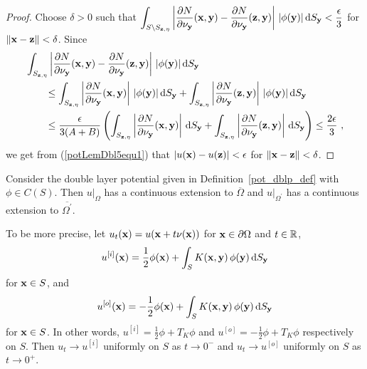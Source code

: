 \begin{proof}
Choose $\delta > 0$ such that
$\displaystyle
\int_{S \setminus S_{\mathbf{z},\eta}} \left| \frac{\partial{N}}{\partial \mathbf{\nu}_{\mathbf{y}}}
(\mathbf{x},\mathbf{y}) - \frac{\partial{N}}{\partial \mathbf{\nu}_{\mathbf{y}}} (\mathbf{z},\mathbf{y})
\right|\,|\phi(\mathbf{y})| \,\mathrm{d}{S}_{\mathbf{y}} < \frac{\epsilon}{3}$ for
$\|\mathbf{x} - \mathbf{z}\| < \delta$.
Since
\begin{align*}
&\int_{S_{\mathbf{z},\eta}}
\left| \frac{\partial{N}}{\partial \mathbf{\nu}_{\mathbf{y}}} (\mathbf{x},\mathbf{y})
- \frac{\partial{N}}{\partial \mathbf{\nu}_{\mathbf{y}}} (\mathbf{z},\mathbf{y}) \right|\,
|\phi(\mathbf{y})| \,\mathrm{d}{S}_{\mathbf{y}} \\
& \qquad \leq \int_{S_{\mathbf{z},\eta}}
\left| \frac{\partial{N}}{\partial \mathbf{\nu}_{\mathbf{y}}} (\mathbf{x},\mathbf{y}) \right|\,
|\phi(\mathbf{y})| \,\mathrm{d}{S}_{\mathbf{y}} 
+ \int_{S_{\mathbf{z},\eta}}
\left| \frac{\partial{N}}{\partial \mathbf{\nu}_{\mathbf{y}}} (\mathbf{z},\mathbf{y}) \right|\,
|\phi(\mathbf{y})| \,\mathrm{d}{S}_{\mathbf{y}} \\
&\qquad \leq \frac{\epsilon}{3(A+B)} \left(
\int_{S_{\mathbf{z},\eta}}
\left| \frac{\partial{N}}{\partial \mathbf{\nu}_{\mathbf{y}}} (\mathbf{x},\mathbf{y}) \right| \,\mathrm{d}{S}_{\mathbf{y}} 
+ \int_{S_{\mathbf{z},\eta}}
\left| \frac{\partial{N}}{\partial \mathbf{\nu}_{\mathbf{y}}} (\mathbf{z},\mathbf{y}) \right| \,\mathrm{d}{S}_{\mathbf{y}}
\right)
\leq \frac{2\epsilon}{3} \ ,
\end{align*}
we get from (\ref{potLemDbl5equ1}) that
$|u(\mathbf{x}) - u(\mathbf{z})| < \epsilon$ for 
$\|\mathbf{x} - \mathbf{z}\| < \delta$.
\end{proof}

\begin{theorem} \label{pot_double_layer}
Consider the double layer potential given in
Definition~\ref{pot_dblp_def} with $\phi \in C(S)$.
Then $\displaystyle u\big|_\Omega$ has a continuous extension to
$\overline{\Omega}$ and $\displaystyle u\big|_{\Omega^{\prime}}$
has a continuous extension to $\displaystyle \overline{\Omega^{\prime}}$.

To be more precise, let
$\displaystyle u_t(\mathbf{x}) = u(\mathbf{x} + t \mathbf{\nu}(\mathbf{x}))$
for $\mathbf{x} \in \partial \Omega$ and $t \in \mathbb{R}$,
\begin{equation} \label{pot_dblpT1}
u^{[i]}(\mathbf{x}) = \frac{1}{2} \phi(\mathbf{x}) + \int_S
K(\mathbf{x},\mathbf{y}) \, \phi(\mathbf{y}) \,\mathrm{d}{S}_{\mathbf{y}}
\end{equation}
for $\mathbf{x} \in S$, and
\begin{equation} \label{pot_dblpT2}
u^{[o]}(\mathbf{x}) = - \frac{1}{2} \phi(\mathbf{x}) + \int_S
K(\mathbf{x},\mathbf{y}) \, \phi(\mathbf{y}) \,\mathrm{d}{S}_{\mathbf{y}}
\end{equation}
for $\mathbf{x} \in S$.
In other words, $\displaystyle u^{[i]} = \frac{1}{2} \phi + T_K \phi$ and
$\displaystyle u^{[o]} = -\frac{1}{2} \phi + T_K \phi$ respectively on $S$.
Then $u_t \rightarrow u^{[i]}$ uniformly on $S$ as $t\rightarrow 0^-$ and
$u_t \rightarrow u^{[o]}$ uniformly on $S$ as $t\rightarrow 0^+$.
\end{theorem}

